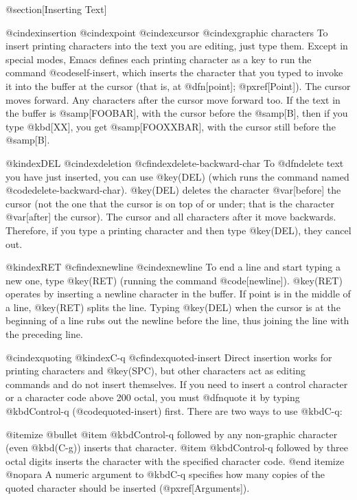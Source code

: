 {{{@section[Inserting Text]

@cindex{insertion}
@cindex{point}
@cindex{cursor}
@cindex{graphic characters}
  To insert printing characters into the text you are editing, just
type them.  Except in special modes, Emacs defines each printing
character as a key to run the command @code{self-insert}, which inserts
the character that you typed to invoke it into the buffer at the
cursor (that is, at @dfn[point]; @pxref[Point]).  The cursor moves
forward.  Any characters after the cursor move forward too.  If the
text in the buffer is @samp[FOOBAR], with the cursor before the
@samp[B], then if you type @kbd[XX], you get @samp[FOOXXBAR], with the
cursor still before the @samp[B].

@kindex{DEL}
@cindex{deletion}
@cfindex{delete-backward-char}
   To @dfn{delete} text you have just inserted, you can use @key(DEL)
(which runs the command named @code{delete-backward-char}).
@key(DEL) deletes the character @var[before] the cursor (not the
one that the cursor is on top of or under; that is the character
@var[after] the cursor).  The cursor and all characters after it move
backwards.  Therefore, if you type a printing character and then type
@key(DEL), they cancel out.

@kindex{RET}
@cfindex{newline}
@cindex{newline}
   To end a line and start typing a new one, type @key(RET)
(running the command @code[newline]).  @key(RET) operates
by inserting a newline character in the buffer.  If point is in the
middle of a line, @key(RET) splits the line.  Typing @key(DEL)
when the cursor is at the beginning of a line rubs out the newline
before the line, thus joining the line with the preceding line.

@cindex{quoting}
@kindex{C-q}
@cfindex{quoted-insert}
  Direct insertion works for printing characters and @key(SPC), but other
characters act as editing commands and do not insert themselves.  If
you need to insert a control character or a character code above 200
octal, you must @dfn{quote} it by typing @kbd{Control-q}
(@code{quoted-insert}) first.  There are two ways to use @kbd{C-q}:

@itemize @bullet
@item
@kbd{Control-q} followed by any non-graphic character (even @kbd(C-g))
inserts that character.
@item
@kbd{Control-q} followed by three octal digits inserts the character
with the specified character code.
@end itemize
@nopara
A numeric argument to @kbd{C-q} specifies how many copies of the
quoted character should be inserted (@pxref[Arguments]).

}}}
